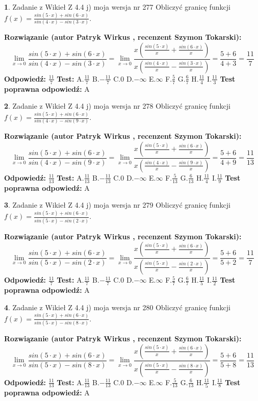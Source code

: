 \documentclass[12pt, a4paper]{article}
\theoremstyle{definition} %
\newtheorem{zad}{}
\newcommand{\zadStart}[1]{\begin{zad}#1\newline}
\newcommand{\zadStop}{\end{zad}}
\newcommand{\rozwStart}[2]{\noindent \textbf{Rozwiązanie (autor #1 , recenzent #2): }\newline}
\newcommand{\rozwStop}{\newline}
\newcommand{\odpStart}{\noindent \textbf{Odpowiedź:}\newline}
\newcommand{\odpStop}{\newline}
\newcommand{\testStart}{\noindent \textbf{Test:}\newline}
\newcommand{\testStop}{\newline}
\newcommand{\kluczStart}{\noindent \textbf{Test poprawna odpowiedź:}\newline}
\newcommand{\kluczStop}{\newline}
\begin{document}
\zadStart{Zadanie z Wikieł Z 4.4 j) moja wersja nr 277}
Obliczyć granicę funkcji $f(x)=\frac{sin(5\cdot x) +sin(6\cdot x)}{sin(4\cdot x) -sin(3\cdot x)}$.
\zadStop
\rozwStart{Patryk Wirkus}{Szymon Tokarski}
$$\lim\limits_{x\to 0}\frac{sin(5\cdot x) +sin(6\cdot x)}{sin(4\cdot x) -sin(3\cdot x)}=\lim\limits_{x\to 0}\frac{x(\frac{sin(5\cdot x)}{x}+\frac{sin(6\cdot x)}{x})}{x(\frac{sin(4\cdot x)}{x}-\frac{sin(3\cdot x)}{x})}=\frac{5+6}{4+3} = \frac{11}{7}$$
\rozwStop
\odpStart
$\frac{11}{7}$
\odpStop
\testStart
A.$\frac{11}{7}$
B.$-\frac{11}{7}$
C.$0$
D.$-\infty$
E.$\infty$
F.$\frac{5}{7}$
G.$\frac{6}{7}$
H.$\frac{11}{4}$
I.$\frac{11}{3}$
\testStop
\kluczStart
A
\kluczStop



\zadStart{Zadanie z Wikieł Z 4.4 j) moja wersja nr 278}
Obliczyć granicę funkcji $f(x)=\frac{sin(5\cdot x) +sin(6\cdot x)}{sin(4\cdot x) -sin(9\cdot x)}$.
\zadStop
\rozwStart{Patryk Wirkus}{Szymon Tokarski}
$$\lim\limits_{x\to 0}\frac{sin(5\cdot x) +sin(6\cdot x)}{sin(4\cdot x) -sin(9\cdot x)}=\lim\limits_{x\to 0}\frac{x(\frac{sin(5\cdot x)}{x}+\frac{sin(6\cdot x)}{x})}{x(\frac{sin(4\cdot x)}{x}-\frac{sin(9\cdot x)}{x})}=\frac{5+6}{4+9} = \frac{11}{13}$$
\rozwStop
\odpStart
$\frac{11}{13}$
\odpStop
\testStart
A.$\frac{11}{13}$
B.$-\frac{11}{13}$
C.$0$
D.$-\infty$
E.$\infty$
F.$\frac{5}{13}$
G.$\frac{6}{13}$
H.$\frac{11}{4}$
I.$\frac{11}{9}$
\testStop
\kluczStart
A
\kluczStop



\zadStart{Zadanie z Wikieł Z 4.4 j) moja wersja nr 279}
Obliczyć granicę funkcji $f(x)=\frac{sin(5\cdot x) +sin(6\cdot x)}{sin(5\cdot x) -sin(2\cdot x)}$.
\zadStop
\rozwStart{Patryk Wirkus}{Szymon Tokarski}
$$\lim\limits_{x\to 0}\frac{sin(5\cdot x) +sin(6\cdot x)}{sin(5\cdot x) -sin(2\cdot x)}=\lim\limits_{x\to 0}\frac{x(\frac{sin(5\cdot x)}{x}+\frac{sin(6\cdot x)}{x})}{x(\frac{sin(5\cdot x)}{x}-\frac{sin(2\cdot x)}{x})}=\frac{5+6}{5+2} = \frac{11}{7}$$
\rozwStop
\odpStart
$\frac{11}{7}$
\odpStop
\testStart
A.$\frac{11}{7}$
B.$-\frac{11}{7}$
C.$0$
D.$-\infty$
E.$\infty$
F.$\frac{5}{7}$
G.$\frac{6}{7}$
H.$\frac{11}{5}$
I.$\frac{11}{2}$
\testStop
\kluczStart
A
\kluczStop



\zadStart{Zadanie z Wikieł Z 4.4 j) moja wersja nr 280}
Obliczyć granicę funkcji $f(x)=\frac{sin(5\cdot x) +sin(6\cdot x)}{sin(5\cdot x) -sin(8\cdot x)}$.
\zadStop
\rozwStart{Patryk Wirkus}{Szymon Tokarski}
$$\lim\limits_{x\to 0}\frac{sin(5\cdot x) +sin(6\cdot x)}{sin(5\cdot x) -sin(8\cdot x)}=\lim\limits_{x\to 0}\frac{x(\frac{sin(5\cdot x)}{x}+\frac{sin(6\cdot x)}{x})}{x(\frac{sin(5\cdot x)}{x}-\frac{sin(8\cdot x)}{x})}=\frac{5+6}{5+8} = \frac{11}{13}$$
\rozwStop
\odpStart
$\frac{11}{13}$
\odpStop
\testStart
A.$\frac{11}{13}$
B.$-\frac{11}{13}$
C.$0$
D.$-\infty$
E.$\infty$
F.$\frac{5}{13}$
G.$\frac{6}{13}$
H.$\frac{11}{5}$
I.$\frac{11}{8}$
\testStop
\kluczStart
A
\kluczStop
\end{document}
